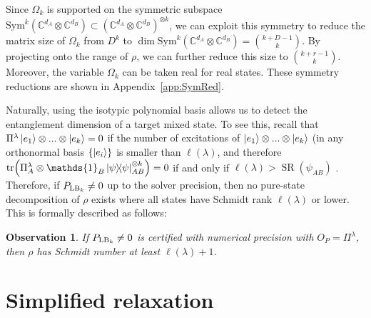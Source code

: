 \documentclass[aps,pra,twocolumn,showpacs,superscriptaddress,groupedaddress]{revtex4-2}
\newcommand{\one}[0]{\mathds{1}}
\newcommand{\C}{\mathds{C}}
\newtheorem{observation}[theorem]{Observation}
\begin{document}
Since $\Omega_k$ is supported on the symmetric subspace $\text{Sym}^k(\C^{d_A}\otimes\C^{d_B})\subset(\C^{d_A}\otimes\C^{d_B})^{\otimes k}$, we can exploit this symmetry to reduce the matrix size of $\Omega_k$ from $D^{k}$ to $\dim \text{Sym}^k(\C^{d_A}\otimes\C^{d_B}) = \binom{k+D-1}{k}$. By projecting onto the range of $\rho$, we can further reduce this size to $\binom{k+r-1}{k}$. Moreover, the variable $\Omega_k$ can be taken real for real states. These symmetry reductions are shown in Appendix~\ref{app:SymRed}.

Naturally, using the isotypic polynomial basis allows us to detect the entanglement dimension of a target mixed state. To see this, recall that $\Pi^\lambda\ket{e_1}\otimes...\otimes\ket{e_k}=0$ if the number of excitations of $\ket{e_1}\otimes...\otimes\ket{e_k}$ (in any orthonormal basis $\{\ket{e_i}\}$ is smaller than $\ell(\lambda)$, and therefore $\tr(\Pi^\lambda_A\otimes\one_B \dyad{\psi}_{AB}^{\otimes k}) = 0$ if and only if $\ell(\lambda) > \operatorname{SR}(\psi_{AB})$ \cite{Christandl_2005,lovitz2026TreeTNtest}.
Therefore, if $P_{{\rm LB}_k}\neq 0$ up to the solver precision, then no pure-state decomposition of $\rho$ exists where all states have Schmidt rank $\ell(\lambda)$ or lower. This is formally described as follows:
\begin{observation}
   If $P_{{\rm LB}_k}\neq 0$ is certified with numerical precision with $O_P=\Pi^\lambda$, then $\rho$ has Schmidt number at least $\ell(\lambda)+1$.
\end{observation}

\section{Simplified relaxation}
\end{document}
